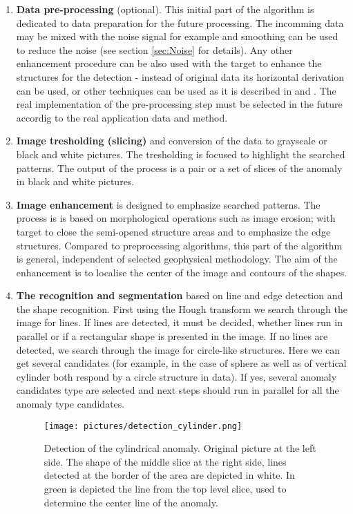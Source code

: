 \documentclass[FM]{tulthesis}
\begin{document}
\begin{enumerate}
\item \textbf{Data pre-processing} (optional). This initial part of the algorithm is dedicated to data preparation for the future processing. The incomming data may be mixed with the noise signal for example and smoothing can be used to reduce the noise  (see section \ref{sec:Noise} for details). Any other enhancement procedure can be also used with the target to enhance the structures for the detection - instead of original data its horizontal derivation can be used, or other techniques can be used as it is described in \cite{Cooper2003} and \cite{Cooper2005}. The real implementation of the pre-processing step must be selected in the future accordig to the real application data and method.
\item \textbf{Image tresholding (slicing)} and conversion of the data to grayscale or black and white pictures. The tresholding is focused to highlight the searched patterns. The output of the process is a pair or a set of slices of the anomaly in black and white pictures. 
\item \textbf{Image enhancement} is designed to emphasize searched patterns. The process is is based on morphological operations such as image erosion; with target to close the semi-opened structure areas and to emphasize the edge structures. Compared to preprocessing algorithms, this part of the algorithm is general, independent of selected geophysical methodology. The aim of the enhancement is to localise the center of the image and contours of the shapes.  
\item \textbf{The recognition and segmentation} based on line and edge detection and the shape recognition. First using the Hough transform we search through the image for lines. If lines are detected, it must be decided, whether lines run in parallel or if a rectangular shape is presented in the image. If no lines are detected, we search through the image for circle-like structures. Here we can get several candidates (for example, in the case of sphere as well as of vertical cylinder both respond by a circle structure in data). If yes, several anomaly candidates type are selected and next steps should run in parallel for all the anomaly type candidates.

\begin{figure}[ht]
\renewcommand{\figurename}{Figure}
\centerline{\texttt{[image: pictures/detection\_cylinder.png]}}
\caption[Gravimetry - detection of horizontal cylinder]{Detection of the cylindrical anomaly. Original picture at the left side. The shape of the middle slice at the right side, lines detected at the border of the area are depicted in white. In green is depicted the line from the top level slice, used to determine the center line of the anomaly. }
\label{fig:DetectionHC}
\end{figure}


\end{enumerate}
\end{document}
